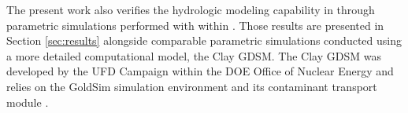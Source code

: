 The present work also verifies the hydrologic modeling capability in \Cyder 
through parametric simulations performed with \Cyder
within \Cyclus. Those results are presented in
Section \ref{sec:results} alongside comparable parametric simulations conducted
using a more detailed computational model, the Clay \gls{GDSM}. The Clay 
\gls{GDSM} was developed by the \gls{UFD} Campaign within the \gls{DOE} Office 
of Nuclear Energy \cite{clayton_generic_2011} and relies on the GoldSim 
simulation environment \cite{golder_associates_goldsim_2010-1} and its 
contaminant transport module \cite{golder_associates_goldsim_2010-1}.

